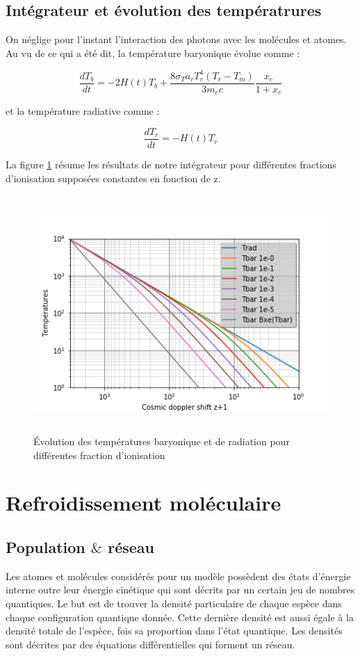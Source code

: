 \documentclass[10pt, a4paper]{report}
\numberwithin{equation}{subsection}
\begin{document}
\subsection{Intégrateur et évolution des températrures}
On néglige pour l'instant l'interaction des photons avec les molécules et atomes. Au vu de ce qui a été dit, la température baryonique évolue comme :

\begin{equation} \label{eq:EERT}
\boxed{\frac{dT_b}{dt} = -2H(t)T_b+\frac{8\sigma_Ta_rT_r^4(T_r-T_m)}{3m_ec}\frac{x_e}{1+x_e}}
\end{equation}

et la température radiative comme :

\begin{equation} \label{eq:EERR}
\boxed{\frac{dT_r}{dt} = -H(t)T_r}
\end{equation}

La figure \ref{fig:T} résume les résultats de notre intégrateur pour différentes fractions d’ionisation supposées constantes en fonction de z.

\begin{figure}[]
\centering
\includegraphics[width=12.0cm,height=9cm]{Temperatures.png}
\caption{\uppercase{é}volution des températures baryonique et de radiation pour différentes fraction d'ionisation}
\label{fig:T}
\end{figure}

\section{Refroidissement moléculaire}
\subsection{Population $\&$ réseau}
Les atomes et molécules considérés pour un modèle possèdent des états d'énergie interne outre leur énergie cinétique qui sont décrits par un certain jeu de nombres quantiques. Le but est de trouver la densité particulaire de chaque espèce dans chaque configuration quantique donnée. Cette dernière densité est aussi égale à la densité totale de l'espèce, fois sa proportion dans l'état quantique. Les densités sont décrites par des équations différentielles qui forment un réseau.\bigskip
\large
\end{document}
